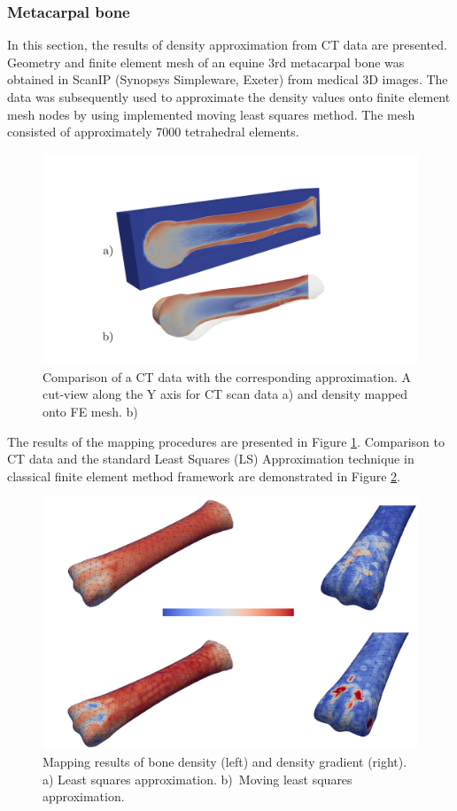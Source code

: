 \documentclass[11pt]{ACMEarticle}
\numberwithin{equation}{section}
\begin{document}
\subsubsection{Metacarpal bone}
In this section, the results of density approximation from CT data are presented. Geometry and finite element mesh of an equine 3rd metacarpal bone was obtained in ScanIP (Synopsys Simpleware, Exeter) from medical 3D images. The data was subsequently used to approximate the density values onto finite element mesh nodes by using implemented moving least squares method. The mesh consisted of approximately 7000 tetrahedral elements. \\
\begin{figure}
	\centering
	\includegraphics[width=0.5\linewidth]{Figures/mwlsmapping_cross}
	\caption{Comparison of a CT data with the corresponding approximation. A cut-view along the Y axis for CT scan data a) and density mapped onto FE mesh. b)}
	\label{fig:mwlsmapping_cross}
\end{figure}
The results of the mapping procedures are presented in Figure \ref{fig:mwlsmapping_cross}. Comparison to CT data and the standard Least Squares (LS) Approximation technique in classical finite element method framework are demonstrated in Figure \ref{fig:mwlsmappingcomparisons}.
\begin{figure}
	\centering
	\includegraphics[width=0.7\linewidth]{Figures/mwls_mapping_comparisons}
	\caption{Mapping results of bone density (left) and density gradient (right). a) Least squares approximation. b)~Moving least squares approximation.}
	\label{fig:mwlsmappingcomparisons}
\end{figure}
\end{document}
